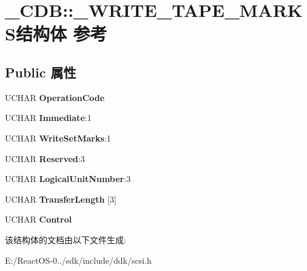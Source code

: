 \hypertarget{struct___c_d_b_1_1___w_r_i_t_e___t_a_p_e___m_a_r_k_s}{}\section{\+\_\+\+C\+DB\+:\+:\+\_\+\+W\+R\+I\+T\+E\+\_\+\+T\+A\+P\+E\+\_\+\+M\+A\+R\+K\+S结构体 参考}
\label{struct___c_d_b_1_1___w_r_i_t_e___t_a_p_e___m_a_r_k_s}
\subsection*{Public 属性}
\begin{DoxyCompactItemize}
\item 
\mbox{\label{struct___c_d_b_1_1___w_r_i_t_e___t_a_p_e___m_a_r_k_s_af7c0e7f1bff015557b1dbfa360c56dd7}} 
U\+C\+H\+AR {\bfseries Operation\+Code}
\item 
\mbox{\label{struct___c_d_b_1_1___w_r_i_t_e___t_a_p_e___m_a_r_k_s_aa8c3cb22a7bb8d8f4ef3b594a5fc5612}} 
U\+C\+H\+AR {\bfseries Immediate}\+:1
\item 
\mbox{\label{struct___c_d_b_1_1___w_r_i_t_e___t_a_p_e___m_a_r_k_s_ac7c59ec0dd2e2f04329da68122f856a0}} 
U\+C\+H\+AR {\bfseries Write\+Set\+Marks}\+:1
\item 
\mbox{\label{struct___c_d_b_1_1___w_r_i_t_e___t_a_p_e___m_a_r_k_s_a910d2d15842eeffb9afd8524a27a4d14}} 
U\+C\+H\+AR {\bfseries Reserved}\+:3
\item 
\mbox{\label{struct___c_d_b_1_1___w_r_i_t_e___t_a_p_e___m_a_r_k_s_a60981ddf829f5e04bff03ca70e73caa2}} 
U\+C\+H\+AR {\bfseries Logical\+Unit\+Number}\+:3
\item 
\mbox{\label{struct___c_d_b_1_1___w_r_i_t_e___t_a_p_e___m_a_r_k_s_af88969660c41aa68c2cd9483ab42a30e}} 
U\+C\+H\+AR {\bfseries Transfer\+Length} \mbox{[}3\mbox{]}
\item 
\mbox{\label{struct___c_d_b_1_1___w_r_i_t_e___t_a_p_e___m_a_r_k_s_aab839b9219d4db5b24d21e66ff7d33ca}} 
U\+C\+H\+AR {\bfseries Control}
\end{DoxyCompactItemize}


该结构体的文档由以下文件生成\+:\begin{DoxyCompactItemize}
\item 
E\+:/\+React\+O\+S-\/0../sdk/include/ddk/scsi.\+h\end{DoxyCompactItemize}
